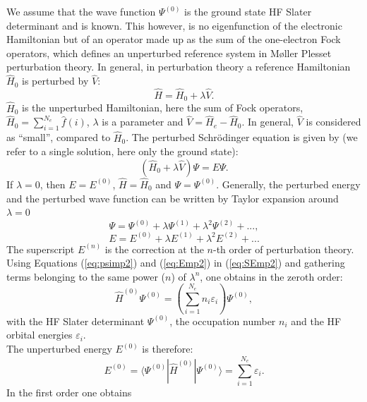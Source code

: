 \documentclass[11pt,DIV=13,BCOR=5mm,a4paper,headinclude]{scrbook}
\begin{document}
We assume that the wave function $\Psi^{(0)}$ is the ground state HF Slater determinant and is known.
This however, is no eigenfunction of the electronic Hamiltonian but of an operator made up as the sum of the one-electron Fock operators, which defines an unperturbed reference system in M\o{}ller Plesset perturbation theory.
In general, in perturbation theory a reference Hamiltonian $\hat{H}_0$ is perturbed by $\hat{V}$:
\begin{equation}
 \hat{H} = \hat{H}_0 + \lambda \hat{V}.
\end{equation}
$\hat{H}_0$ is the unperturbed Hamiltonian, here the sum of Fock operators, $\hat{H}_0=\sum_{i=1}^{N_e}\hat{f}(i)$, $\lambda$ is a parameter and $\hat{V}=\hat{H}_e - \hat{H}_0$.
In general, $\hat{V}$ is considered as ``small'', compared to $\hat{H}_0$.
The perturbed Schrödinger equation is given by (we refer to a single solution, here only the ground state):
\begin{equation}\label{eq:SEmp2}
 (\hat{H}_0 + \lambda \hat{V})\Psi = E\Psi.
\end{equation}
If $\lambda=0$, then $E=E^{(0)}$, $\hat{H} = \hat{H}_0$ and $\Psi=\Psi^{(0)}$.
Generally, the perturbed energy and the perturbed wave function can be written by Taylor expansion around $\lambda=0$
\begin{equation}\label{eq:psimp2}
 \Psi = \Psi^{(0)} + \lambda \Psi^{(1)} + \lambda^2\Psi^{(2)} + ...,
\end{equation}
\begin{equation}\label{eq:Emp2}
 E = E^{(0)} + \lambda E^{(1)} + \lambda^2E^{(2)} + ...
\end{equation}
The superscript $E^{(n)}$ is the correction at the $n$-th order of perturbation theory.\\
Using Equations (\ref{eq:psimp2}) and (\ref{eq:Emp2}) in (\ref{eq:SEmp2}) and gathering terms belonging to the same power ($n$) of $\lambda^n$, one obtains in the zeroth order:
\begin{equation}
 \hat{H}^{(0)}\Psi^{(0)}=(\sum_{i=1}^{N_e} n_i\varepsilon_i)\Psi^{(0)},
\end{equation}
with the HF Slater determinant $\Psi^{(0)}$, the occupation number $n_i$ and the HF orbital energies $\varepsilon_i$.\\
The unperturbed energy $E^{(0)}$ is therefore:
\begin{equation}
 E^{(0)} = \langle\Psi^{(0)}|\hat{H}^{(0)}|\Psi^{(0)}\rangle=\sum\limits_{i=1}^{N_e}\varepsilon_i.
\end{equation}
In the first order one obtains
\end{document}

